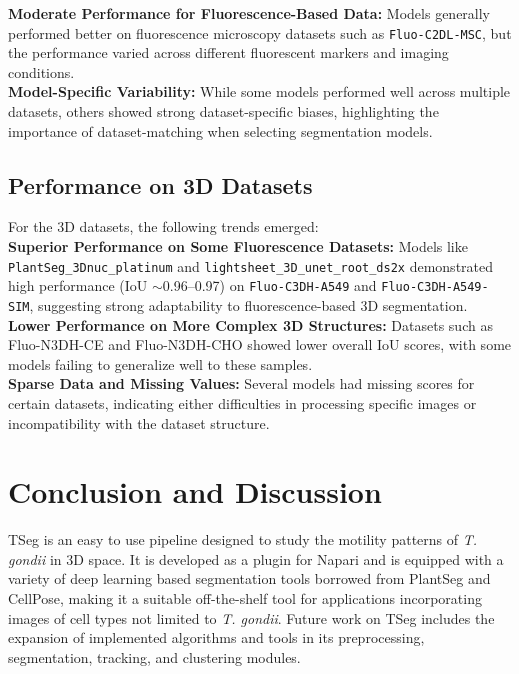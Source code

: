 \documentclass[./dissertation.tex]{subfiles}
\begin{document}
\textbf{Moderate Performance for Fluorescence-Based Data:} Models generally performed better on fluorescence microscopy datasets such as \texttt{Fluo-C2DL-MSC}, but the performance varied across different fluorescent markers and imaging conditions. \\

\textbf{Model-Specific Variability:} While some models performed well across multiple datasets, others showed strong dataset-specific biases, highlighting the importance of dataset-matching when selecting segmentation models. \\

\subsection{Performance on 3D Datasets \\}

For the 3D datasets, the following trends emerged: \\

\textbf{Superior Performance on Some Fluorescence Datasets:} Models like \texttt{PlantSeg\_3Dnuc\_platinum} and \texttt{lightsheet\_3D\_unet\_root\_ds2x} demonstrated high performance (IoU $\sim$0.96--0.97) on \texttt{Fluo-C3DH-A549} and \texttt{Fluo-C3DH-A549-SIM}, suggesting strong adaptability to fluorescence-based 3D segmentation. \\

\textbf{Lower Performance on More Complex 3D Structures:} Datasets such as Fluo-N3DH-CE and Fluo-N3DH-CHO showed lower overall IoU scores, with some models failing to generalize well to these samples. \\

\textbf{Sparse Data and Missing Values:} Several models had missing scores for certain datasets, indicating either difficulties in processing specific images or incompatibility with the dataset structure. \\


\section{Conclusion and Discussion}
TSeg is an easy to use pipeline designed to study the motility patterns of \textit{T. gondii} in 3D space. It is developed as a plugin for Napari and is equipped with a variety of deep learning based segmentation tools borrowed from PlantSeg and CellPose, making it a suitable off-the-shelf tool for applications incorporating images of cell types not limited to \textit{T. gondii}. Future work on TSeg includes the expansion of implemented algorithms and tools in its preprocessing, segmentation, tracking, and clustering modules.
\end{document}
